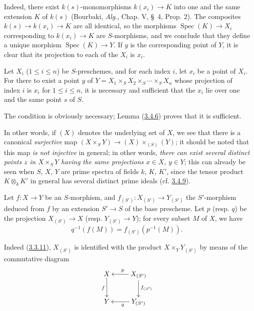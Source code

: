 Indeed, there exist $k(s)$-monomorphisms $k(x_i)\to K$ into one and the same
extension $K$ of $k(s)$ (Bourbaki, \emph{Alg.}, Chap. V, \S~4, Prop. 2). The
composites $k(s)\to k(x_i)\to K$ are all identical, so the morphisms
$\operatorname{Spec}(K)\to X_i$ corresponding to $k(x_i)\to K$ are
$S$-morphisms, and we conclude that they define a unique morphism
$\operatorname{Spec}(K)\to Y$. If $y$ is the corresponding point of $Y$, it
is clear that its projection to each of the $X_i$ is $x_i$.

\begin{proposition}[3.4.7]
\label{I.3.4.7}
Let $X_i$ ($1\leq i\leq n$) be $S$-preschemes, and for each index $i$,
let $x_i$ be a point of $X_i$. For there to exist a point $y$ of
$Y=X_1\times_S X_2\times_S\cdots\times_S X_n$ whose projection of index $i$ is
$x_i$ for $1\leq i\leq n$, it is necessary and sufficient that the $x_i$ lie
over one and the same point $s$ of $S$.
\end{proposition}

The condition is obviously necessary; Lemma
(\hyperref[I.3.4.6]{3.4.6}) proves that it is sufficient.

\label{I.3.4.7.underlying-map}
In other words, if $(X)$ denotes the underlying set of $X$, we
see that there is a canonical \emph{surjective} map
$(X\times_S Y)\to (X)\times_{(S)}(Y)$; it should be noted that this map
\emph{is not injective} in general; in other words, \emph{there can exist
several distinct points $z$ in $X\times_S Y$ having the same projections
$x\in X$, $y\in Y$}; this can already be seen when $S$, $X$, $Y$ are
prime spectra of fields $k$, $K$, $K'$, since the tensor product
$K\otimes_k K'$ in general has several distinct prime ideals
(cf. \hyperref[I.3.4.9]{3.4.9}).

\begin{corollary}[3.4.8]
\label{I.3.4.8}
Let $f:X\to Y$ be an $S$-morphism, and $f_{(S')}:X_{(S')}\to Y_{(S')}$ the
$S'$-morphism deduced from $f$ by an extension $S'\to S$ of the base prescheme.
Let $p$ (resp. $q$) be the projection $X_{(S')}\to X$ (resp.
$Y_{(S')}\to Y$); for every subset $M$ of $X$, we have
\label{I.3.4.8.base-change-image}
\[
  q^{-1}(f(M))=f_{(S')}(p^{-1}(M)).
\]
\end{corollary}

Indeed (\hyperref[I.3.3.11]{3.3.11}), $X_{(S')}$ is identified with the
product $X\times_Y Y_{(S')}$ by means of the commutative diagram
\label{I.3.4.8.proof-diagram}
\[
  \xymatrix{
    X\ar[d]_f & X_{(S')}\ar[l]_p\ar[d]^{f_{(S')}}\\
    Y & Y_{(S')}\ar[l]^q
  }
\]

